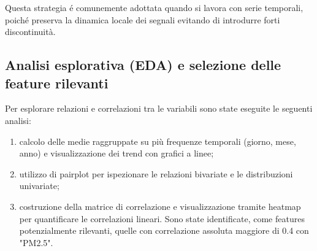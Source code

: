 \documentclass[a4paper,12pt]{report}
\begin{document}
	Questa strategia é comunemente adottata quando si lavora con serie temporali, poiché preserva la dinamica locale dei segnali evitando di introdurre forti discontinuità.
	
	\subsection{Analisi esplorativa (EDA) e selezione delle feature rilevanti}
	Per esplorare relazioni e correlazioni tra le variabili sono state eseguite le seguenti analisi:
	
	\begin{enumerate}
		\item calcolo delle medie raggruppate su più frequenze temporali (giorno, mese, anno) e visualizzazione dei trend con grafici a linee;
		\item utilizzo di pairplot per ispezionare le relazioni bivariate e le distribuzioni univariate;
		\item costruzione della matrice di correlazione e visualizzazione tramite heatmap per quantificare le correlazioni lineari. Sono state identificate, come features potenzialmente rilevanti, quelle con correlazione assoluta maggiore di 0.4 con "PM2.5".
	\end{enumerate}
	
\end{document}
